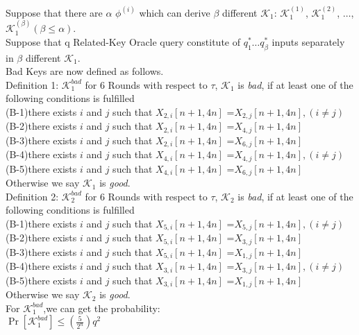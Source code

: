 Suppose that there are $\alpha$ $\phi^{(i)}$ which can derive $\beta$ different $\mathcal{K}_{1}$: $\mathcal{K}_{1}^{(1)}$, $\mathcal{K}_{1}^{(2)}$, $\dots$,$\mathcal{K}_{1}^{(\beta)}$$(\beta\leq \alpha)$.\\
Suppose that q Related-Key Oracle query constitute of $q_{1}^{\ast} \dots q_{\beta}^{\ast}$ inputs separately in $\beta$ different $\mathcal{K}_{1}$.\\

Bad Keys are now defined as follows.\\
Definition 1: $\mathcal{K}_{1}^{bad}$  for 6 Rounds
with respect to $\tau$, $\mathcal{K}_{1}$  is {\it bad}, if at least one of the following conditions is fulfilled\\
(B-1)there exists $i$ and $j$ such that $X_{2,i}[n+1,4n]$ =$X_{2,j}[n+1,4n],(i\neq j)$\\
(B-2)there exists $i$ and $j$ such that $X_{2,i}[n+1,4n]$ =$X_{4,j}[n+1,4n]$\\
(B-3)there exists $i$ and $j$ such that $X_{2,i}[n+1,4n]$ =$X_{6,j}[n+1,4n]$\\
(B-4)there exists $i$ and $j$ such that $X_{4,i}[n+1,4n]$ =$X_{4,j}[n+1,4n],(i\neq j)$\\
(B-5)there exists $i$ and $j$ such that $X_{4,i}[n+1,4n]$ =$X_{6,j}[n+1,4n]$\\
Otherwise we say $\mathcal{K}_{1}$ is {\it good}.\\

Definition 2: $\mathcal{K}_{2}^{bad}$  for 6 Rounds
with respect to $\tau$, $\mathcal{K}_{2}$  is {\it bad}, if at least one of the following conditions is fulfilled \\
(B-1)there exists $i$ and $j$ such that $X_{5,i}[n+1,4n]$ =$X_{5,j}[n+1,4n],(i\neq j)$\\
(B-2)there exists $i$ and $j$ such that $X_{5,i}[n+1,4n]$ =$X_{3,j}[n+1,4n]$\\
(B-3)there exists $i$ and $j$ such that $X_{5,i}[n+1,4n]$ =$X_{1,j}[n+1,4n]$\\
(B-4)there exists $i$ and $j$ such that $X_{3,i}[n+1,4n]$ =$X_{3,j}[n+1,4n],(i\neq j)$\\
(B-5)there exists $i$ and $j$ such that $X_{3,i}[n+1,4n]$ =$X_{1,j}[n+1,4n]$\\
Otherwise we say $\mathcal{K}_{2}$ is {\it good}.\\

For $\mathcal{K}_{1}^{bad}$,we can get the probability:\\
$\Pr[\mathcal{K}_{1}^{bad}]\leq (\frac{5}{2^{n}})q^{2}$\\

